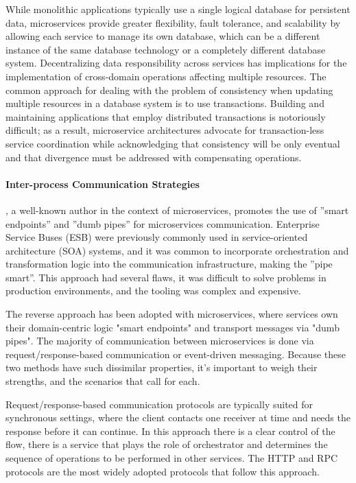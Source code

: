 While monolithic applications typically use a single logical database for persistent data, microservices provide greater flexibility, fault tolerance,
and scalability by allowing each service to manage its own database, which can be a different instance of the same database technology or a completely different database system.
Decentralizing data responsibility across services has implications for the implementation of cross-domain operations affecting multiple resources.
The common approach for dealing with the problem of consistency when updating multiple resources in a database system is to use transactions.
Building and maintaining applications that employ distributed transactions is notoriously difficult; as a result,
microservice architectures advocate for transaction-less service coordination while acknowledging
that consistency will be only eventual and that divergence must be addressed with compensating operations.

\paragraph{Inter-process Communication Strategies}

\citeauthor{microservices}, a well-known author in the context of microservices, promotes the use of ''smart endpoints'' and ''dumb pipes'' for microservices communication.
Enterprise Service Buses (ESB) \cite{esb} were previously commonly used in service-oriented architecture (SOA) systems,
and it was common to incorporate orchestration and transformation logic into the communication infrastructure,
making the ''pipe smart''.
This approach had several flaws, it was difficult to solve problems in production environments, and the tooling was complex and expensive.

The reverse approach has been adopted with microservices,
where services own their domain-centric logic "smart endpoints" and transport messages via "dumb pipes".
The majority of communication between microservices is done via request/response-based communication or event-driven messaging.
Because these two methods have such dissimilar properties, it's important to weigh their strengths, and the scenarios that call for each.

Request/response-based communication protocols are typically suited for synchronous settings,
where the client contacts one receiver at time and needs the response before it can continue.
In this approach there is a clear control of the flow,
there is a service that plays the role of orchestrator and determines the sequence of operations to be performed in other services.
The HTTP and RPC protocols are the most widely adopted protocols that follow this approach.

